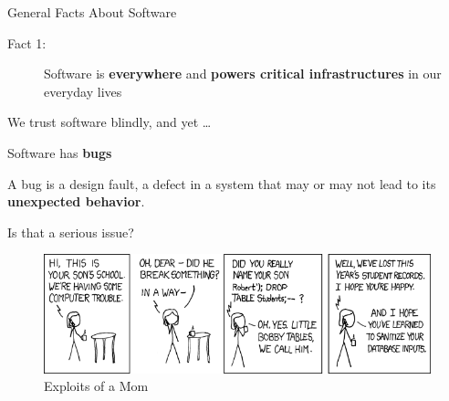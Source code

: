 \documentclass[aspectratio=169]{beamer}
\begin{document}
  \begin{frame}{General Facts About Software}
    \pause
    \begin{description}
      \item[Fact 1:] Software is \textbf{everywhere} and \textbf{powers critical infrastructures} in our everyday lives\\
    \end{description}
    \pause
    \begin{center}
    We trust software blindly, and yet \ldots
    \end{center}
    \vspace{-1.3em}
    \pause
    \begin{description}
      \vfill  
      \item[Fact 2:] Software has \textbf{bugs}
    \end{description}
    \pause
    \vfill
    \begin{definition}
      \vspace{0.3em}
      A \textcolor{mLightGreen}{bug} is a design fault, a defect in a system that may or may not lead to its \textbf{unexpected behavior}.
    \end{definition}
    \vfill
  \end{frame}

  \begin{frame}{Is that a serious issue?}
    \vspace{0.5em}
    \begin{figure}
      \includegraphics[scale=0.6]{figures/exploits_of_a_mom}
      \caption{Exploits of a Mom}
    \end{figure}
  \end{frame}
  
\end{document}

